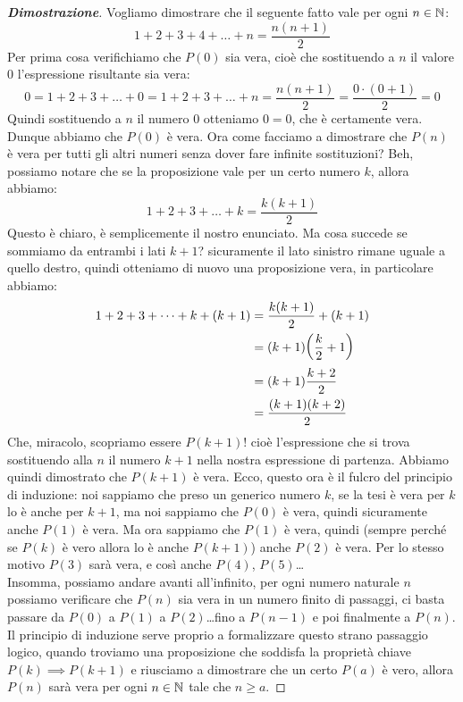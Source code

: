 \documentclass[11pt]{scrartcl}
\begin{document}
	\begin{proof}[\textbf{Dimostrazione}]
		Vogliamo dimostrare che il seguente fatto vale per ogni $n\in\mathbb N$:
		$$1+2+3+4+\dots+n=\frac{n(n+1)}{2}$$
		Per prima cosa verifichiamo che $P(0)$ sia vera, cioè che sostituendo a $n$ il valore $0$ l'espressione risultante sia vera:
		$$0=1+2+3+\dots+0=1+2+3+\dots+n=\frac{n(n+1)}{2}=\frac{0\cdot(0+1)}{2}=0$$
		Quindi sostituendo a $n$ il numero $0$ otteniamo $0=0$, che è certamente vera. Dunque abbiamo che $P(0)$ è vera.
		Ora come facciamo a dimostrare che $P(n)$ è vera per tutti gli altri numeri senza dover fare infinite sostituzioni? Beh, possiamo notare che se la proposizione vale per un certo numero $k$, allora abbiamo:
		$$1+2+3+\dots+k=\frac{k(k+1)}{2}$$
		Questo è chiaro, è semplicemente il nostro enunciato. Ma cosa succede se sommiamo da entrambi i lati $k+1$? sicuramente il lato sinistro rimane uguale a quello destro, quindi otteniamo di nuovo una proposizione vera, in particolare abbiamo:
		\begin{equation}\notag
			\begin{split}
				1+2+3+\dots+k+(k+1) & = \frac{k(k+1)}{2}+(k+1) \\
				& = (k+1)\bigg(\frac{k}{2}+1\bigg) \\
				& = (k+1)\frac{k+2}{2} \\
				& = \frac{(k+1)(k+2)}{2}
			\end{split}
		\end{equation}
		Che, miracolo, scopriamo essere $P(k+1)$! cioè l'espressione che si trova sostituendo alla $n$ il numero $k+1$ nella nostra espressione di partenza. Abbiamo quindi dimostrato che $P(k+1)$ è vera. Ecco, questo ora è il fulcro del principio di induzione: noi sappiamo che preso un generico numero $k$, se la tesi è vera per $k$ lo è anche per $k+1$, ma noi sappiamo che $P(0)$ è vera, quindi sicuramente anche $P(1)$ è vera. Ma ora sappiamo che $P(1)$ è vera, quindi (sempre perché se $P(k)$ è vero allora lo è anche $P(k+1)$) anche $P(2)$ è vera. Per lo stesso motivo $P(3)$ sarà vera, e così anche $P(4)$, $P(5)$\dots
		\\
		Insomma, possiamo andare avanti all'infinito, per ogni numero naturale $n$ possiamo verificare che $P(n)$ sia vera in un numero finito di passaggi, ci basta passare da $P(0)$ a $P(1)$ a $P(2)$\dots fino a $P(n-1)$ e poi finalmente a $P(n)$.\\
		Il principio di induzione serve proprio a formalizzare questo strano passaggio logico, quando troviamo una proposizione che soddisfa la proprietà chiave $P(k)\implies P(k+1)$ e riusciamo a dimostrare che un certo $P(a)$ è vero, allora $P(n)$ sarà vera per ogni $n\in\mathbb N$ tale che $n\ge a$.

\end{proof}
\end{document}
